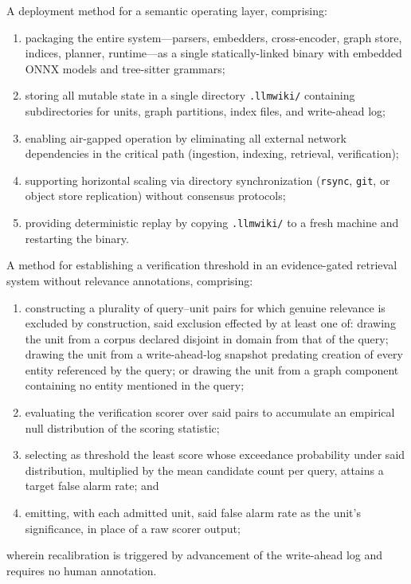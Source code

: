 \begin{claim}
\label{claim:deployment}
A deployment method for a semantic operating layer, comprising:
\begin{enumerate}
  \item packaging the entire system---parsers, embedders, cross-encoder, graph store, indices, planner, runtime---as a single statically-linked binary with embedded ONNX models and tree-sitter grammars;
  \item storing all mutable state in a single directory \texttt{.llmwiki/} containing subdirectories for units, graph partitions, index files, and write-ahead log;
  \item enabling air-gapped operation by eliminating all external network dependencies in the critical path (ingestion, indexing, retrieval, verification);
  \item supporting horizontal scaling via directory synchronization (\texttt{rsync}, \texttt{git}, or object store replication) without consensus protocols;
  \item providing deterministic replay by copying \texttt{.llmwiki/} to a fresh machine and restarting the binary.
\end{enumerate}
\end{claim}

\begin{claim}
\label{claim:far-calibration}
A method for establishing a verification threshold in an evidence-gated retrieval system without relevance annotations, comprising:
\begin{enumerate}
  \item constructing a plurality of query--unit pairs for which genuine relevance is excluded by construction, said exclusion effected by at least one of: drawing the unit from a corpus declared disjoint in domain from that of the query; drawing the unit from a write-ahead-log snapshot predating creation of every entity referenced by the query; or drawing the unit from a graph component containing no entity mentioned in the query;
  \item evaluating the verification scorer over said pairs to accumulate an empirical null distribution of the scoring statistic;
  \item selecting as threshold the least score whose exceedance probability under said distribution, multiplied by the mean candidate count per query, attains a target false alarm rate; and
  \item emitting, with each admitted unit, said false alarm rate as the unit's significance, in place of a raw scorer output;
\end{enumerate}
wherein recalibration is triggered by advancement of the write-ahead log and requires no human annotation.
\end{claim}

